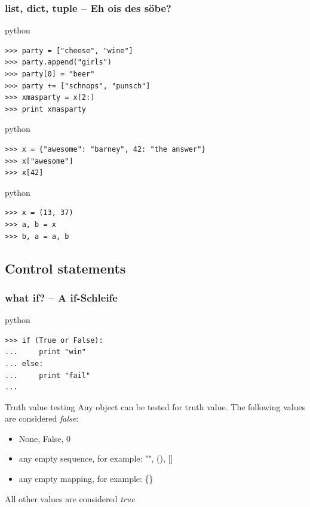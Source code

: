 \documentclass{beamer}
\begin{document}
\begin{frame}[fragile]
	\frametitle{list, dict, tuple -- Eh ois des söbe?}
	
	\begin{exampleblock}{python}
	\begin{lstlisting}
>>> party = ["cheese", "wine"]
>>> party.append("girls")
>>> party[0] = "beer"
>>> party += ["schnops", "punsch"]
>>> xmasparty = x[2:]
>>> print xmasparty
	\end{lstlisting}
	\end{exampleblock}
	
	\pause
	
	\begin{exampleblock}{python}
	\begin{lstlisting}
>>> x = {"awesome": "barney", 42: "the answer"}
>>> x["awesome"]
>>> x[42]
	\end{lstlisting}
	\end{exampleblock}

	\pause

	\begin{exampleblock}{python}
	\begin{lstlisting}
>>> x = (13, 37)
>>> a, b = x
>>> b, a = a, b
	\end{lstlisting}
	\end{exampleblock}
\end{frame}


\subsection{Control statements}
\begin{frame}[fragile]
    \frametitle{what \textbf{if}? -- A if-Schleife}
    
    \begin{exampleblock}{python}
    \begin{lstlisting}
>>> if (True or False):
...     print "win"
... else:
...     print "fail"
...
    \end{lstlisting}
    \end{exampleblock}
    
	\pause

    \begin{block}{Truth value testing}
    Any object can be tested for truth value. The following values are considered \emph{false}:
    \begin{itemize}
        \item None, False, 0
        \item any empty sequence, for example: "", (), []
        \item any empty mapping, for example: \{\}
    \end{itemize}
    All other values are considered \emph{true}
    \end{block}
\end{frame}
\end{document}
